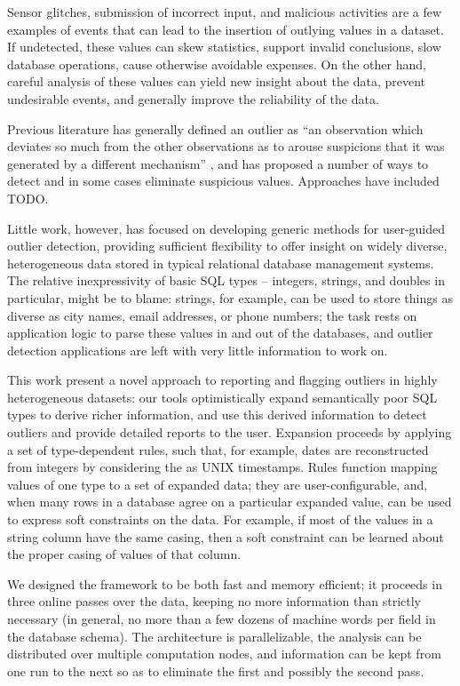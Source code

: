 
Sensor glitches, submission of incorrect input, and malicious activities are a few examples of events that can lead to the insertion of outlying values in a dataset. If undetected, these values can skew statistics, support invalid conclusions, slow database operations, cause otherwise avoidable expenses. On the other hand, careful analysis of these values can yield new insight about the data, prevent undesirable events, and generally improve the reliability of the data.

Previous literature has generally defined an outlier as ``an observation which deviates so much from the other observations as to arouse suspicions that it was generated by a different mechanism'' \cite{Hawkins1980}, and has proposed a number of ways to detect and in some cases eliminate suspicious values. Approaches have included TODO. 

Little work, however, has focused on developing generic methods for user-guided outlier detection, providing sufficient flexibility to offer insight on widely diverse, heterogeneous data stored in typical relational database management systems. The relative inexpressivity of basic SQL types -- integers, strings, and doubles in particular, might be to blame: strings, for example, can be used to store things as diverse as city names, email addresses, or phone numbers; the task rests on application logic to parse these values in and out of the databases, and outlier detection applications are left with very little information to work on.

This work present a novel approach to reporting and flagging outliers in highly heterogeneous datasets: our tools optimistically expand semantically poor SQL types to derive richer information, and use this derived information to detect outliers and provide detailed reports to the user. Expansion proceeds by applying a set of type-dependent rules, such that, for example, dates are reconstructed from integers by considering the as UNIX timestamps. Rules function mapping values of one type to a set of expanded data; they are user-configurable, and, when many rows in a database agree on a particular expanded value, can be used to express soft constraints on the data. For example, if most of the values in a string column have the same casing, then a soft constraint can be learned about the proper casing of values of that column.

We designed the framework to be both fast and memory efficient; it proceeds in three online passes over the data, keeping no more information than strictly necessary (in general, no more than a few dozens of machine words per field in the database schema). The architecture is parallelizable, the analysis can be distributed over multiple computation nodes, and information can be kept from one run to the next so as to eliminate the first and possibly the second pass.

